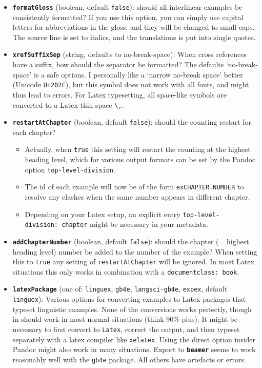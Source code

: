 \documentclass[
]{article}
\providecommand{\tightlist}{%
  \setlength{\itemsep}{0pt}\setlength{\parskip}{0pt}}
\begin{document}
\begin{itemize}
\tightlist
\item
  \textbf{\texttt{formatGloss}} (boolean, default \texttt{false}):
  should all interlinear examples be consistently formatted? If you use
  this option, you can simply use capital letters for abbreviations in
  the gloss, and they will be changed to small caps. The source line is
  set to italics, and the translations is put into single quotes.
\item
  \textbf{\texttt{xrefSuffixSep}} (string, defaults to no-break-space):
  When cross references have a suffix, how should the separator be
  formatted? The defaults `no-break-space' is a safe options. I
  personally like a `narrow no-break space' better (Unicode
  \texttt{U+202F}), but this symbol does not work with all fonts, and
  might thus lead to errors. For Latex typesetting, all space-like
  symbols are converted to a Latex thin space
  \texttt{\textbackslash{},}.
\item
  \textbf{\texttt{restartAtChapter}} (boolean, default \texttt{false}):
  should the counting restart for each chapter?

  \begin{itemize}
  \tightlist
  \item
    Actually, when \texttt{true} this setting will restart the counting
    at the highest heading level, which for various output formats can
    be set by the Pandoc option \texttt{top-level-division}.
  \item
    The id of each example will now be of the form
    \texttt{exCHAPTER.NUMBER} to resolve any clashes when the same
    number appears in different chapter.
  \item
    Depending on your Latex setup, an explicit entry
    \texttt{top-level-division:\ chapter} might be necessary in your
    metadata.
  \end{itemize}
\item
  \textbf{\texttt{addChapterNumber}} (boolean, default \texttt{false}):
  should the chapter (= highest heading level) number be added to the
  number of the example? When setting this to \texttt{true} any setting
  of \texttt{restartAtChapter} will be ignored. In most Latex situations
  this only works in combination with a \texttt{documentclass:\ book}.
\item
  \textbf{\texttt{latexPackage}} (one of: \texttt{linguex},
  \texttt{gb4e}, \texttt{langsci-gb4e}, \texttt{expex}, default
  \texttt{linguex}): Various options for converting examples to Latex
  packages that typeset linguistic examples. None of the conversions
  works perfectly, though in should work in most normal situations
  (think 90\%-plus). It might be necessary to first convert to
  \texttt{Latex}, correct the output, and then typeset separately with a
  latex compiler like \texttt{xelatex}. Using the direct option insider
  Pandoc might also work in many situations. Export to
  \textbf{\texttt{beamer}} seems to work reasonably well with the
  \texttt{gb4e} package. All others have artefacts or errors.
\end{itemize}
\end{document}

